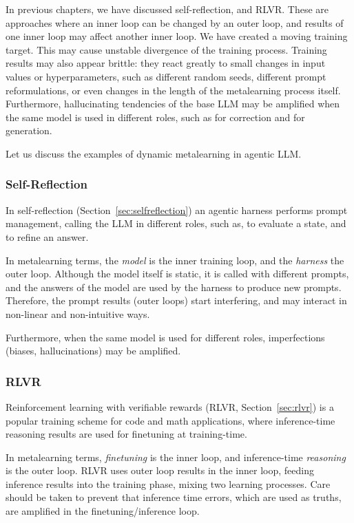 In previous chapters, we have discussed self-reflection, and RLVR. These are  approaches where an inner loop can be changed by an outer loop, and results of one inner loop may affect another inner loop. We have created a moving training target. This may cause unstable divergence of the training process. Training results may also appear brittle: they react  greatly to small  changes in input values or hyperparameters, such as different random seeds, different prompt reformulations, or even changes in the length of the metalearning process itself. 
%
Furthermore, hallucinating tendencies of the base LLM  may be amplified when the same model is used in different roles, such as for correction and for generation. 

Let us discuss the  examples of dynamic metalearning in agentic LLM.

\subsubsection{Self-Reflection}
In self-reflection (Section~\ref{sec:selfreflection}) an agentic harness performs prompt management, calling the LLM in different roles, such as, to evaluate a state, and to refine an answer. 

In metalearning terms, the {\em model} is the inner training loop, and the {\em harness} the outer loop. Although the model itself is static, it is called with different prompts, and the answers of the model are used by the harness to produce new prompts. Therefore, the prompt results (outer loops) start interfering, and may interact in non-linear and non-intuitive ways. 

Furthermore, when the same model is used for different roles, imperfections (biases, hallucinations) may be amplified.

\subsubsection{RLVR}
Reinforcement learning with verifiable rewards (RLVR, Section~\ref{sec:rlvr}) is a popular training scheme for code and math applications, where inference-time reasoning results are used for finetuning at training-time. 

In metalearning terms, {\em finetuning} is the inner loop, and inference-time {\em reasoning} is the outer loop. RLVR uses outer loop results in the inner loop, feeding inference results into the training phase,  mixing two learning processes. Care should be taken to prevent that inference time errors, which are used as truths, are amplified in the finetuning/inference loop. 

